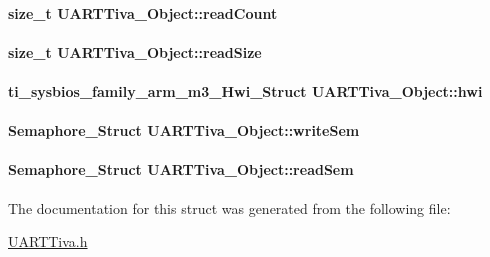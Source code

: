 \paragraph[{read\-Count}]{\setlength{\rightskip}{0pt plus 5cm}size\-\_\-t U\-A\-R\-T\-Tiva\-\_\-\-Object\-::read\-Count}\label{struct_u_a_r_t_tiva___object_adcbed405b5985eb7a91d1e111df915b6}
\paragraph[{read\-Size}]{\setlength{\rightskip}{0pt plus 5cm}size\-\_\-t U\-A\-R\-T\-Tiva\-\_\-\-Object\-::read\-Size}\label{struct_u_a_r_t_tiva___object_a9ff3cdeba70a612ccf0c90c1223759d6}
\paragraph[{hwi}]{\setlength{\rightskip}{0pt plus 5cm}ti\-\_\-sysbios\-\_\-family\-\_\-arm\-\_\-m3\-\_\-\-Hwi\-\_\-\-Struct U\-A\-R\-T\-Tiva\-\_\-\-Object\-::hwi}\label{struct_u_a_r_t_tiva___object_aea348826397b66af9bac958c67a96def}
\paragraph[{write\-Sem}]{\setlength{\rightskip}{0pt plus 5cm}Semaphore\-\_\-\-Struct U\-A\-R\-T\-Tiva\-\_\-\-Object\-::write\-Sem}\label{struct_u_a_r_t_tiva___object_abae42cf8deae05251566657fef910814}
\paragraph[{read\-Sem}]{\setlength{\rightskip}{0pt plus 5cm}Semaphore\-\_\-\-Struct U\-A\-R\-T\-Tiva\-\_\-\-Object\-::read\-Sem}\label{struct_u_a_r_t_tiva___object_a395f3b54f4968fd8d3dcb1aa0e33bde4}


The documentation for this struct was generated from the following file\-:\begin{DoxyCompactItemize}
\item 
\hyperlink{_u_a_r_t_tiva_8h}{U\-A\-R\-T\-Tiva.\-h}\end{DoxyCompactItemize}
